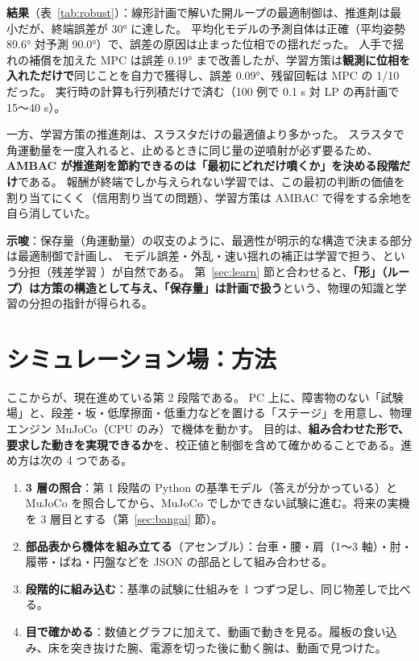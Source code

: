 \documentclass[paper=a4paper,fontsize=10pt,twocolumn,column_gap=2zw,line_length=24zw,number_of_lines=46,head_space=20mm]{jlreq}
\begin{document}
\textbf{結果}（表~\ref{tab:robust}）：線形計画で解いた開ループの最適制御は、推進剤は最小だが、終端誤差が 30° に達した。
平均化モデルの予測自体は正確（平均姿勢 89.6° 対予測 90.0°）で、誤差の原因は止まった位相での揺れだった。
人手で揺れの補償を加えた MPC は誤差 0.19° まで改善したが、学習方策は\textbf{観測に位相を入れただけで}同じことを自力で獲得し、誤差 0.09°、残留回転は MPC の 1/10 だった。
実行時の計算も行列積だけで済む（100 例で 0.1 s 対 LP の再計画で 15〜40 s）。

一方、学習方策の推進剤は、スラスタだけの最適値より多かった。
スラスタで角運動量を一度入れると、止めるときに同じ量の逆噴射が必ず要るため、\textbf{AMBAC が推進剤を節約できるのは「最初にどれだけ噴くか」を決める段階だけ}である。
報酬が終端でしか与えられない学習では、この最初の判断の価値を割り当てにくく（信用割り当ての問題）、学習方策は AMBAC で得をする余地を自ら消していた。

\textbf{示唆}：保存量（角運動量）の収支のように、最適性が明示的な構造で決まる部分は最適制御で計画し、
モデル誤差・外乱・速い揺れの補正は学習で担う、という分担（残差学習 \cite{johannink2019}）が自然である。
第~\ref{sec:learn} 節と合わせると、\textbf{「形」（ループ）は方策の構造として与え、「保存量」は計画で扱う}という、物理の知識と学習の分担の指針が得られる。


\section{シミュレーション場：方法}\label{sec:field}

ここからが、現在進めている第 2 段階である。
PC 上に、障害物のない「試験場」と、段差・坂・低摩擦面・低重力などを置ける「ステージ」を用意し、物理エンジン MuJoCo（CPU のみ）で機体を動かす。
目的は、\textbf{組み合わせた形で、要求した動きを実現できるか}を、校正値と制御を含めて確かめることである。進め方は次の 4 つである。

\begin{enumerate}\setlength{\itemsep}{0pt}
\item \textbf{3 層の照合}：第 1 段階の Python の基準モデル（答えが分かっている）と MuJoCo を照合してから、MuJoCo でしかできない試験に進む。将来の実機を 3 層目とする（第~\ref{sec:bangai} 節）。
\item \textbf{部品表から機体を組み立てる}（アセンブル）：台車・腰・肩（1〜3 軸）・肘・履帯・ばね・円盤などを JSON の部品として組み合わせる。
\item \textbf{段階的に組み込む}：基準の試験に仕組みを 1 つずつ足し、同じ物差しで比べる。
\item \textbf{目で確かめる}：数値とグラフに加えて、動画で動きを見る。履板の食い込み、床を突き抜けた腕、電源を切った後に動く腕は、動画で見つけた。
\end{enumerate}
\end{document}
